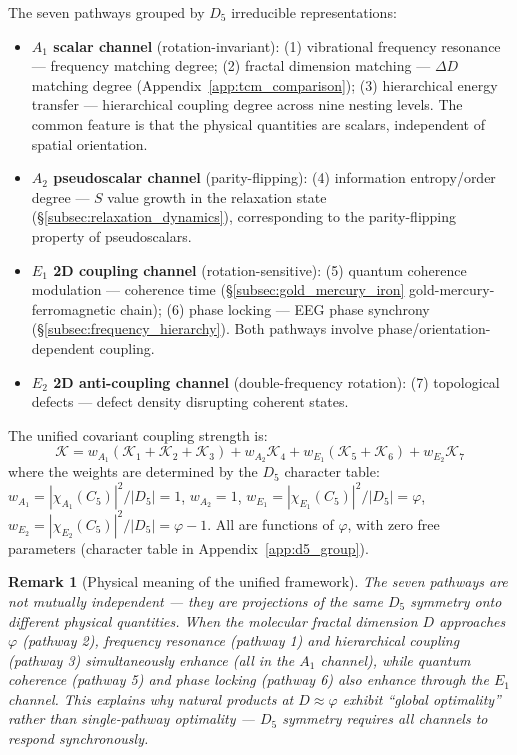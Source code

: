 \documentclass[12pt,a4paper,twocolumn]{article}
\renewcommand{\phi}{\varphi}
\newtheorem{remark}[theorem]{Remark}
\begin{document}
The seven pathways grouped by $D_5$ irreducible representations:
\begin{itemize}
\item \textbf{$A_1$ scalar channel} (rotation-invariant): (1) vibrational frequency resonance --- frequency matching degree; (2) fractal dimension matching --- $\Delta D$ matching degree (Appendix~\ref{app:tcm_comparison}); (3) hierarchical energy transfer --- hierarchical coupling degree across nine nesting levels. The common feature is that the physical quantities are scalars, independent of spatial orientation.
\item \textbf{$A_2$ pseudoscalar channel} (parity-flipping): (4) information entropy/order degree --- $S$ value growth in the relaxation state (\S\ref{subsec:relaxation_dynamics}), corresponding to the parity-flipping property of pseudoscalars.
\item \textbf{$E_1$ 2D coupling channel} (rotation-sensitive): (5) quantum coherence modulation --- coherence time (\S\ref{subsec:gold_mercury_iron} gold-mercury-ferromagnetic chain); (6) phase locking --- EEG phase synchrony (\S\ref{subsec:frequency_hierarchy}). Both pathways involve phase/orientation-dependent coupling.
\item \textbf{$E_2$ 2D anti-coupling channel} (double-frequency rotation): (7) topological defects --- defect density disrupting coherent states.
\end{itemize}

The unified covariant coupling strength is:
\begin{equation}
\label{eq:d5_coupling_en}
\mathcal{K} = w_{A_1}(\mathcal{K}_1 + \mathcal{K}_2 + \mathcal{K}_3) + w_{A_2}\mathcal{K}_4 + w_{E_1}(\mathcal{K}_5 + \mathcal{K}_6) + w_{E_2}\mathcal{K}_7
\end{equation}
where the weights are determined by the $D_5$ character table: $w_{A_1} = |\chi_{A_1}(C_5)|^2/|D_5| = 1$, $w_{A_2} = 1$, $w_{E_1} = |\chi_{E_1}(C_5)|^2/|D_5| = \phi$, $w_{E_2} = |\chi_{E_2}(C_5)|^2/|D_5| = \phi - 1$. All are functions of $\phi$, with zero free parameters (character table in Appendix~\ref{app:d5_group}).

\begin{remark}[Physical meaning of the unified framework]
The seven pathways are not mutually independent --- they are projections of the same $D_5$ symmetry onto different physical quantities. When the molecular fractal dimension $D$ approaches $\phi$ (pathway 2), frequency resonance (pathway 1) and hierarchical coupling (pathway 3) simultaneously enhance (all in the $A_1$ channel), while quantum coherence (pathway 5) and phase locking (pathway 6) also enhance through the $E_1$ channel. This explains why natural products at $D \approx \phi$ exhibit ``global optimality'' rather than single-pathway optimality --- $D_5$ symmetry requires all channels to respond synchronously.
\end{remark}
\end{document}
